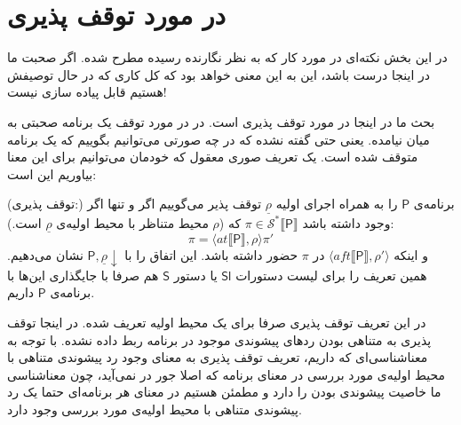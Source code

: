\section{در مورد توقف پذیری}

در این بخش نکته‌ای در مورد کار که به نظر نگارنده رسیده مطرح شده. اگر صحبت ما در اینجا درست باشد، این به این معنی خواهد بود که کل کاری که در حال توصیفش هستیم قابل پیاده سازی نیست!

بحث ما در اینجا در مورد توقف پذیری است. در \cite{calcul} در مورد توقف یک برنامه صحبتی به میان نیامده. یعنی حتی گفته نشده که در چه صورتی می‌توانیم بگوییم که یک برنامه متوقف شده است. یک تعریف  صوری معقول که خودمان می‌توانیم برای این معنا بیاوریم این است:

\begin{defn}
(توقف پذیری:) برنامه‌ی $\mathsf{P}$ را به همراه اجرای اولیه $\underline{\rho}$ توقف پذیر می‌گوییم اگر و تنها اگر وجود داشته باشد 
	$\pi \in \mathcal{S}^* \llbracket \mathsf{P} \rrbracket$ 
	که ($\rho$ محیط متناظر با محیط اولیه‌ی $\underline{\rho}$ است.):
	$$\pi = \langle at \llbracket \mathsf{P} \rrbracket , \rho \rangle \pi'$$
	و اینکه $\langle aft\llbracket \mathsf{P} \rrbracket , \rho' \rangle$ در $\pi$ حضور داشته باشد. این اتفاق را با 
	$\mathsf{P,\underline{\rho}\downarrow}$
	نشان می‌دهیم. همین تعریف را برای لیست دستورات $\mathsf{Sl}$ یا دستور $\mathsf{S}$ هم صرفا با جایگذاری این‌ها با برنامه‌ی $\mathsf{P}$ داریم.
\end{defn} 
در این تعریف توقف پذیری صرفا برای یک محیط اولیه تعریف شده.
در اینجا توقف پذیری به متناهی بودن ردهای پیشوندی موجود در برنامه ربط داده نشده. با توجه به معناشناسی‌ای که داریم، تعریف توقف پذیری به معنای وجود رد پیشوندی متناهی با محیط اولیه‌ی مورد بررسی در معنای برنامه که اصلا جور در نمی‌آید، چون معناشناسی ما خاصیت پیشوندی بودن را دارد و مطمئن هستیم در معنای هر برنامه‌ای حتما یک رد پیشوندی متناهی با محیط اولیه‌ی مورد بررسی وجود دارد.

